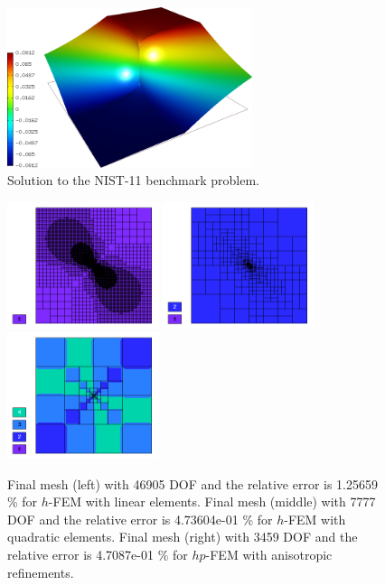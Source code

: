 \documentclass[12pt]{elsarticle}
\begin{document}
\begin{figure}[H]
\centering
\includegraphics[height=4.7cm]{nist/nist-11/solution.png}
\caption{Solution to the NIST-11 benchmark problem.}
\vspace{-8mm}
\label{fig:sln-nist11}
\end{figure}

\begin{figure}[H]
\centering
\includegraphics[height=3.7cm]{nist/nist-11/mesh_h1_aniso.png}
\includegraphics[height=3.7cm]{nist/nist-11/mesh_h2_aniso.png}
\includegraphics[height=3.7cm]{nist/nist-11/mesh_hp_aniso.png}
\vspace{-3mm}
\caption{
Final mesh (left) with 46905 DOF and the relative error is 1.25659 \% for $h$-FEM with linear elements.
Final mesh (middle) with 7777 DOF and the relative error is 4.73604e-01 \% for $h$-FEM with quadratic elements.
Final mesh (right) with 3459 DOF and the relative error is 4.7087e-01 \% for $hp$-FEM with anisotropic refinements.}
\vspace{-2mm}
\label{fig:nist-11-hp-aniso}
\end{figure}
\end{document}
